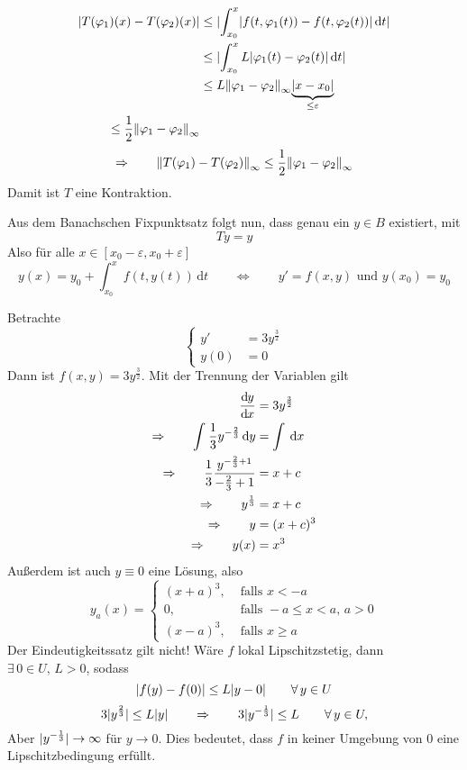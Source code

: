 \begin{beweis}
\begin{enumerate}[(i)]
		\begin{align*}
			\abs{T(\varphi_1)(x)-T(\varphi_2)(x)} &\leq \abs{\int_{x_0}^{x} \abs{f(t,\varphi_1(t))- f(t,\varphi_2(t))} \,\mathrm{d}t} \\
			&\leq \abs{\int_{x_0}^{x} L \abs{ \varphi_1(t)-\varphi_2(t)} \,\mathrm{d}t} \\
			&\leq  L \norm{\varphi_1- \varphi_2}_{\infty} \underset{\leq \varepsilon}{\underbrace{\abs{x-x_0}}} \\
			\leq \frac{1}{2} \norm{\varphi_1- \varphi_2}_{\infty}
		\end{align*}
		\[
			\Rightarrow \qquad \norm{T(\varphi_1)-T(\varphi_2)}_{\infty} \leq \frac{1}{2}\norm{ \varphi_1- \varphi_2}_{\infty}
		\]
		Damit ist $T$ eine Kontraktion.
	\end{enumerate}
	Aus dem Banachschen Fixpunktsatz folgt nun, dass genau ein $ y \in B$ existiert, mit
	\[
		Ty=y 
	\] 
	Also für alle $x \in [x_0 - \varepsilon , x_0 + \varepsilon]$
	\[
		y(x) = y_0 + \int_{x_0}^{x} f(t,y(t)) \,\mathrm{d}t \qquad \Leftrightarrow \qquad y'=f(x,y) \text{ und } y(x_0) = y_0
	\]
\end{beweis}
\begin{beispiel}
	Betrachte
	\[
		\begin{cases}
			y'&=3y^{\frac{3}{2}} \\ 
			y(0)&= 0
		\end{cases}
	\]
	Dann ist $f(x,y) = 3 y^{\frac{3}{2}}$. Mit der Trennung der Variablen gilt
	\begin{align*}
		\frac{\mathrm{d}\mkern-1.0mu y}{\mathrm{d}\mkern-1.0mu x}  &= 3 y^{\frac{3}{2}} \\
		\Rightarrow \qquad \int_{}^{} \frac{1}{3} y^{- \frac{2}{3}} \,\mathrm{d}y &= \int_{}^{} \,\mathrm{d}x \\
		\Rightarrow \qquad \frac{1}{3} \frac{y^{- \frac{2}{3}+1}}{- \frac{2}{3}+1} &= x + c \\
		\Rightarrow \qquad y^{\frac{1}{3}} &= x+ c \\
		\Rightarrow \qquad y &= (x+c)^3 \\
		\Rightarrow \qquad y(x) &= x^3
	\end{align*}
	Außerdem ist auch $y \equiv 0$ eine Lösung, also
	\[
		y_a(x) = \begin{cases}
			(x+a)^3, &\text{ falls }x<-a\\
			0, &\text{ falls }-a \leq x < a, \,a >0 \\
			(x-a)^3, &\text{ falls }x \geq a
		\end{cases}
	\]
	Der Eindeutigkeitssatz gilt nicht! Wäre $f$ lokal Lipschitzstetig, dann $\exists\, 0 \in U,\, L>0$, sodass
	\[
		\lvert f(y)-f(0)\rvert \leq L \lvert y-0\rvert \qquad \forall\, y \in U
	\]
	\[
		3 \lvert y^{\frac{2}{3}}\rvert \leq L \lvert y\rvert \qquad \Rightarrow \qquad 3 \lvert y^{-\frac{1}{3}}\rvert \leq  L \qquad \forall\, y \in U,
	\]
	Aber $\lvert y^{- \frac{1}{3}}\rvert \to  \infty$ für $y \to 0$. Dies bedeutet, dass $f$ in keiner Umgebung von $0$ eine Lipschitzbedingung erfüllt.
\end{beispiel}
